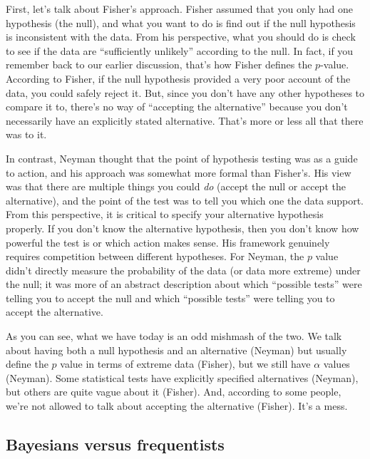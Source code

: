 \documentclass[
  11pt,
  a4paper,
  twoside,symmetric,openright]{book}
\theoremstyle{break}
\theoremstyle{break}
\begin{document}
First, let's talk about Fisher's approach. Fisher assumed that you only had one hypothesis (the null), and what you want to do is find out if the null hypothesis is inconsistent with the data. From his perspective, what you should do is check to see if the data are ``sufficiently unlikely'' according to the null. In fact, if you remember back to our earlier discussion, that's how Fisher defines the \(p\)-value. According to Fisher, if the null hypothesis provided a very poor account of the data, you could safely reject it. But, since you don't have any other hypotheses to compare it to, there's no way of ``accepting the alternative'' because you don't necessarily have an explicitly stated alternative. That's more or less all that there was to it.

In contrast, Neyman thought that the point of hypothesis testing was as a guide to action, and his approach was somewhat more formal than Fisher's. His view was that there are multiple things you could \emph{do} (accept the null or accept the alternative), and the point of the test was to tell you which one the data support. From this perspective, it is critical to specify your alternative hypothesis properly. If you don't know the alternative hypothesis, then you don't know how powerful the test is or which action makes sense. His framework genuinely requires competition between different hypotheses. For Neyman, the \(p\) value didn't directly measure the probability of the data (or data more extreme) under the null; it was more of an abstract description about which ``possible tests'' were telling you to accept the null and which ``possible tests'' were telling you to accept the alternative.

As you can see, what we have today is an odd mishmash of the two. We talk about having both a null hypothesis and an alternative (Neyman) but usually define the \(p\) value in terms of extreme data (Fisher), but we still have \(\alpha\) values (Neyman). Some statistical tests have explicitly specified alternatives (Neyman), but others are quite vague about it (Fisher). And, according to some people, we're not allowed to talk about accepting the alternative (Fisher). It's a mess.

\subsection{Bayesians versus frequentists}\label{bayesians-versus-frequentists}
\end{document}
